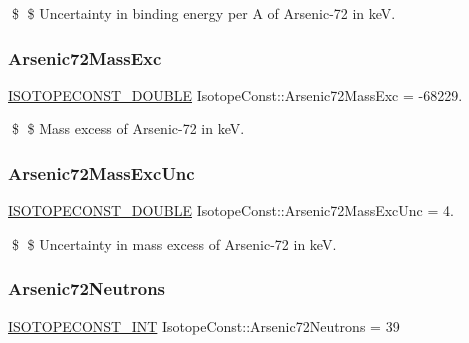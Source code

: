\$ \$ Uncertainty in binding energy per A of Arsenic-\/72 in keV. \mbox{\label{group___isotope_const-_arsenic-_as72_ga294e9563ed2d0ae80c1abad69c7c8c4e}} 
\subsubsection{\texorpdfstring{Arsenic72\+Mass\+Exc}{Arsenic72MassExc}}
{\footnotesize\ttfamily \mbox{\hyperlink{group___isotope_const-_macros_ga8f45a7272ce02c0b4c65c44636ed719a}{I\+S\+O\+T\+O\+P\+E\+C\+O\+N\+S\+T\+\_\+\+D\+O\+U\+B\+LE}} Isotope\+Const\+::\+Arsenic72\+Mass\+Exc = -\/68229.}

\$ \$ Mass excess of Arsenic-\/72 in keV. \mbox{\label{group___isotope_const-_arsenic-_as72_ga452b0345d7c7b923c887df82acc57ba2}} 
\subsubsection{\texorpdfstring{Arsenic72\+Mass\+Exc\+Unc}{Arsenic72MassExcUnc}}
{\footnotesize\ttfamily \mbox{\hyperlink{group___isotope_const-_macros_ga8f45a7272ce02c0b4c65c44636ed719a}{I\+S\+O\+T\+O\+P\+E\+C\+O\+N\+S\+T\+\_\+\+D\+O\+U\+B\+LE}} Isotope\+Const\+::\+Arsenic72\+Mass\+Exc\+Unc = 4.}

\$ \$ Uncertainty in mass excess of Arsenic-\/72 in keV. \mbox{\label{group___isotope_const-_arsenic-_as72_ga7953289ca634b3c85b81b19f1b03f3f2}} 
\subsubsection{\texorpdfstring{Arsenic72\+Neutrons}{Arsenic72Neutrons}}
{\footnotesize\ttfamily \mbox{\hyperlink{group___isotope_const-_macros_ga5f18360b3e99483a35c32d789e62621c}{I\+S\+O\+T\+O\+P\+E\+C\+O\+N\+S\+T\+\_\+\+I\+NT}} Isotope\+Const\+::\+Arsenic72\+Neutrons = 39}

